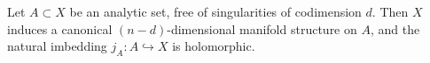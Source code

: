 Let $A \subset X$ be an analytic set, free of singularities of codimension $d$. Then $X$ induces a canonical $(n - d)$-dimensional manifold structure on $A$, and the natural imbedding $j_A: A \hookrightarrow X$ is holomorphic.
